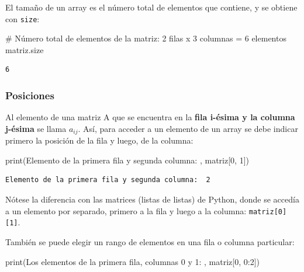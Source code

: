 \documentclass[
  letterpaper,
  DIV=11,
  numbers=noendperiod]{scrreprt}
\newenvironment{Shaded}{\begin{snugshade}}{\end{snugshade}}
\newcommand{\BuiltInTok}[1]{\textcolor[rgb]{0.00,0.23,0.31}{#1}}
\newcommand{\CommentTok}[1]{\textcolor[rgb]{0.37,0.37,0.37}{#1}}
\newcommand{\DecValTok}[1]{\textcolor[rgb]{0.68,0.00,0.00}{#1}}
\newcommand{\NormalTok}[1]{\textcolor[rgb]{0.00,0.23,0.31}{#1}}
\newcommand{\StringTok}[1]{\textcolor[rgb]{0.13,0.47,0.30}{#1}}
\begin{document}
El tamaño de un array es el número total de elementos que contiene, y se
obtiene con \texttt{size}:

\begin{Shaded}
\begin{Highlighting}[]
\CommentTok{\# Número total de elementos de la matriz: 2 filas x 3 columnas = 6 elementos}
\NormalTok{matriz.size}
\end{Highlighting}
\end{Shaded}

\begin{verbatim}
6
\end{verbatim}

\subsubsection{Posiciones}\label{posiciones}

Al elemento de una matriz A que se encuentra en la \textbf{fila i-ésima
y la columna j-ésima} se llama \(a_{ij}\). Así, para acceder a un
elemento de un array se debe indicar primero la posición de la fila y
luego, de la columna:

\begin{Shaded}
\begin{Highlighting}[]
\BuiltInTok{print}\NormalTok{(}\StringTok{\textquotesingle{}Elemento de la primera fila y segunda columna: \textquotesingle{}}\NormalTok{, matriz[}\DecValTok{0}\NormalTok{, }\DecValTok{1}\NormalTok{])}
\end{Highlighting}
\end{Shaded}

\begin{verbatim}
Elemento de la primera fila y segunda columna:  2
\end{verbatim}

Nótese la diferencia con las matrices (listas de listas) de Python,
donde se accedía a un elemento por separado, primero a la fila y luego a
la columna: \texttt{matriz{[}0{]}{[}1{]}}.

También se puede elegir un rango de elementos en una fila o columna
particular:

\begin{Shaded}
\begin{Highlighting}[]
\BuiltInTok{print}\NormalTok{(}\StringTok{\textquotesingle{}Los elementos de la primera fila, columnas 0 y 1: \textquotesingle{}}\NormalTok{, matriz[}\DecValTok{0}\NormalTok{, }\DecValTok{0}\NormalTok{:}\DecValTok{2}\NormalTok{])}
\end{Highlighting}
\end{Shaded}
\end{document}
